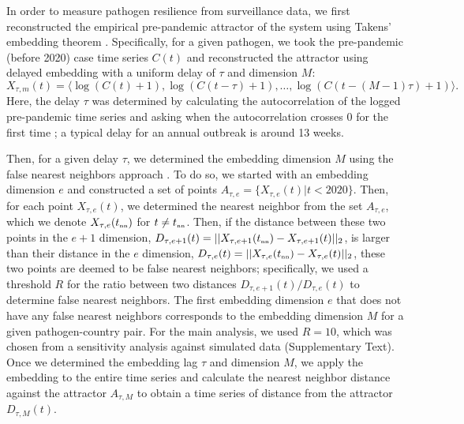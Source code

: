\documentclass[12pt]{article}
\newcommand{\tsub}[2]{#1_{{\textrm{\tiny #2}}}}
\begin{document}
In order to measure pathogen resilience from surveillance data, we first reconstructed the empirical pre-pandemic attractor of the system using Takens' embedding theorem \citep{takens2006detecting}.
Specifically, for a given pathogen, we took the pre-pandemic (before 2020) case time series $C(t)$ and reconstructed the attractor using delayed embedding with a uniform delay of $\tau$ and dimension $M$:
\begin{equation}
X_{\tau,m}(t) = \langle\log(C(t)+1), \log(C(t-\tau)+1), \dots, \log(C(t-(M-1)\tau)+1)\rangle.
\end{equation}
Here, the delay $\tau$ was determined by calculating the autocorrelation of the logged pre-pandemic time series and asking when the autocorrelation crosses 0 for the first time \citep{tan2023selecting};
a typical delay for an annual outbreak is around 13 weeks.

Then, for a given delay $\tau$, we determined the embedding dimension $M$ using the false nearest neighbors approach \citep{kennel1992determining,tan2023selecting}.
To do so, we started with an embedding dimension $e$ and constructed a set of points $A_{\tau,e}= \{X_{\tau,e}(t) | t < 2020\}$.
Then, for each point $X_{\tau,e}(t)$, we determined the nearest neighbor from the set $A_{\tau,e}$, which we denote $X_{\tau,e}(\tsub{t}{nn})$ for $t \neq \tsub{t}{nn}$.
Then, if the distance between these two points in the $e+1$ dimension, $D_{\tau,e+1}(t) = ||X_{\tau,e+1}(\tsub{t}{nn})-X_{\tau,e+1}(t)||_2$, is larger than their distance in the $e$ dimension, $D_{\tau,e}(t) = ||X_{\tau,e}(\tsub{t}{nn})-X_{\tau,e}(t)||_2$, these two points are deemed to be false nearest neighbors;
specifically, we used a threshold $R$ for the ratio between two distances $D_{\tau,e+1}(t)/D_{\tau,e}(t)$ to determine false nearest neighbors.
The first embedding dimension $e$ that does not have any false nearest neighbors corresponds to the embedding dimension $M$ for a given pathogen-country pair.
For the main analysis, we used $R=10$, which was chosen from a sensitivity analysis against simulated data (Supplementary Text).
Once we determined the embedding lag $\tau$ and dimension $M$, we apply the embedding to the entire time series and calculate the nearest neighbor distance against the attractor $A_{\tau,M}$ to obtain a time series of distance from the attractor $D_{\tau,M}(t)$.
\end{document}
